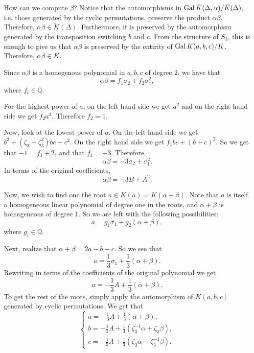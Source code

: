 How can we compute \(\beta\)? Notice that the
automorphisms in \(\operatorname{Gal} \tilde K(\Delta, \alpha) / \tilde K(\Delta)\), i.e. those generated by the
cyclic permutations, preserve the product \(\alpha\beta\). Therefore, \(\alpha\beta \in \tilde K(\Delta)\). 
Furthermore, it is preserved by the automorphism generated by the transposition switching \(b\) and \(c\).
From the structure of \(S_3\), this is enough to give us that \(\alpha\beta\) is preserved by the entirity
of \(\operatorname{Gal} K(a,b,c) / K\). Therefore, \(\alpha\beta \in K\).

Since \(\alpha\beta\) is a homogenous polynomial in \(a, b, c\) of degree 2, we have that
\begin{equation}
\alpha\beta = f_1 \sigma_2 + f_2 \sigma_1^2, 
\end{equation}
where \(f_i \in \mathbb Q\).

For the highest power of \(a\), on the left hand side we get \(a^2\) and on the right hand side we
get \(f_2 a^2\). Therefore \(f_2 = 1\).

Now, look at the lowest power of \(a\). On the left hand side we get \(b^2 + (\zeta_3 + \zeta_3^2)bc + c^2\).
On the right hand side we get \(f_1 bc + (b + c)^2\). So we get that \(-1 = f_1 + 2\), and that \(f_1 = -3\).
Therefore,
\begin{equation}
\alpha\beta = -3 \sigma_2 + \sigma_1^2.
\end{equation}
In terms of the original coefficients,
\begin{equation}
\alpha\beta = -3B + A^2.
\end{equation}

Now, we wish to find one the root \(a \in K(a) = K(\alpha + \beta)\). Note that \(a\) is itself
a homogeneous linear polynomial of degree one in the roots, and
\(\alpha + \beta\) is homogeneous of degree 1. So we are left with the following possibilities:
\begin{equation}
a = g_1 \sigma_1 +g_2 (\alpha + \beta),
\end{equation}
where \(g_i \in \mathbb Q\).

Next, realize that \(\alpha + \beta = 2a - b - c\). So we see that
\begin{equation}
a = \frac{1}{3} \sigma_1 + \frac{1}{3} (\alpha + \beta).
\end{equation}
Rewriting in terms of the coefficients of the original polynomial we get
\begin{equation}
a = -\frac{1}{3} A + \frac{1}{3}(\alpha + \beta).
\end{equation}
To get the rest of the roots, simply apply the automorphism of \(K(a, b, c)\) generated by cyclic permutations.
We get that
\begin{equation}
\begin{cases}
a = -\frac{1}{3} A + \frac{1}{3}(\alpha + \beta), \\
b = -\frac{1}{3} A + \frac{1}{3}(\zeta_3^{-1} \alpha + \zeta_3 \beta), \\
c = -\frac{1}{3} A + \frac{1}{3}(\zeta_3 \alpha + \zeta_3^{-1} \beta). 
\end{cases}
\end{equation}

